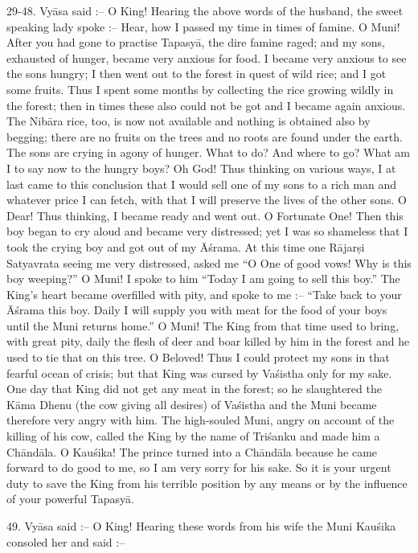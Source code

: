 29-48. Vy\=asa said :-- O King! Hearing the above words of the husband, the sweet speaking lady spoke :-- Hear, how I passed my time in times of famine. O Muni! After you had gone to practise Tapasy\=a, the dire famine raged; and my sons, exhausted of hunger, became very anxious for food. I became very anxious to see the sons hungry; I then went out to the forest in quest of wild rice; and I got some fruits. Thus I spent some months by collecting the rice growing wildly in the forest; then in times these also could not be got and I became again anxious. The Nib\=ara rice, too, is now not available and nothing is obtained also by begging; there are no fruits on the trees and no roots are found under the earth. The sons are crying in agony of hunger. What to do? And where to go? What am I to say now to the hungry boys? Oh God! Thus thinking on various ways, I at last came to this conclusion that I would sell one of my sons to a rich man and whatever price I can fetch, with that I will preserve the lives of the other sons. O Dear! Thus thinking, I became ready and went out. O Fortunate One! Then this boy began to cry aloud and became very distressed; yet I was so shameless that I took the crying boy and got out of my \=A\'srama. At this time one R\=ajar\d{s}i Satyavrata seeing me very distressed, asked me ``O One of good vows! Why is this boy weeping?'' O Muni! I spoke to him ``Today I am going to sell this boy.'' The King's heart became overfilled with pity, and spoke to me :-- ``Take back to your \=A\'srama this boy. Daily I will supply you with meat for the food of your boys until the Muni returns home.'' O Muni! The King from that time used to bring, with great pity, daily the flesh of deer and boar killed by him in the forest and he used to tie that on this tree. O Beloved! Thus I could protect my sons in that fearful ocean of crisis; but that King was cursed by Va\'sistha only for my sake. One day that King did not get any meat in the forest; so he slaughtered the K\=ama Dhenu (the cow giving all desires) of Va\'sistha and the Muni became therefore very angry with him. The high-souled Muni, angry on account of the killing of his cow, called the King by the name of Tri\'sanku and made him a Ch\=and\=ala. O Kau\'sika! The prince turned into a Ch\=and\=ala because he came forward to do good to me, so I am very sorry for his sake. So it is your urgent duty to save the King from his terrible position by any means or by the influence of your powerful Tapasy\=a.

49. Vy\=asa said :-- O King! Hearing these words from his wife the Muni Kau\'sika consoled her and said :--

